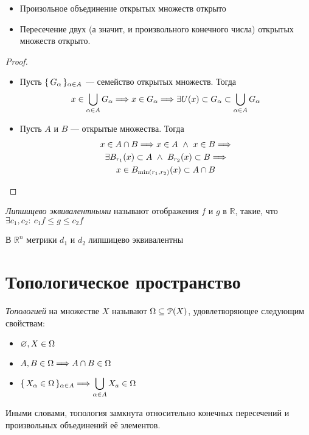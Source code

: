 \begin{theorem}
    \enewline
    \begin{itemize}
        \item Произольное объединение открытых множеств открыто
        \item Пересечение двух (а значит, и произвольного конечного числа)
        открытых множеств открыто.
    \end{itemize}
\end{theorem}
\begin{proof}
    \enewline
    \begin{itemize}
        \item Пусть $\{\, G_\alpha \,\}_{\alpha \in A}$ --- семейство открытых множеств. Тогда
        \begin{gather*}
            x \in \bigcup_{\alpha \in A}{G_\alpha} \Longrightarrow x \in G_\alpha \Longrightarrow \exists U(x)
            \subset G_\alpha \subset \bigcup_{\alpha \in A}{G_\alpha}
        \end{gather*}
        \item Пусть $A$ и $B$ --- открытые множества. Тогда
        \begin{gather*}
            x \in A \cap B \Longrightarrow x \in A ~\wedge~ x \in B \Longrightarrow \\
            \exists B_{r_1}(x) \subset A ~\wedge~ B_{r_2}(x) \subset B \Longrightarrow \\
            x \in B_{\min(r_1, r_2)}(x) \subset A \cap B
        \end{gather*}
    \end{itemize}
\end{proof}

\begin{definition}
    \textit{Липшицево эквивалентными} называют отображения $f$ и $g$ в
    $\mathbb{R}$, такие, что $\exists c_1, c_2 \colon~ c_1f \leqslant g \leqslant
    c_2f$
\end{definition}
\begin{example}
    В $\mathbb{R}^n$ метрики $d_1$ и $d_2$ липшицево эквивалентны
\end{example}

\newpage

\section{Топологическое пространство}

\begin{definition}
    \textit{Топологией} на множестве $X$ называют $\Omega \subseteq \mathcal{P}(X)$,
    удовлетворяющее следующим свойствам:
    \begin{itemize}
        \item $\varnothing, X \in \Omega$
        \item $A, B \in \Omega \Longrightarrow A \cap B \in \Omega$
        \item $\displaystyle \{\, X_\alpha \in \Omega \,\}_{\alpha \in A} \Longrightarrow
        \bigcup_{\alpha \in A}{X_a}\in \Omega$
    \end{itemize}
    Иными словами, топология замкнута относительно конечных пересечений и
    произвольных объединений её элементов.
\end{definition}

